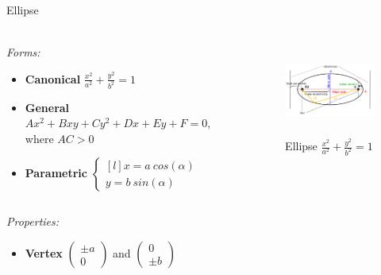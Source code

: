 \documentclass[aspectratio=169]{beamer}
\begin{document}
\begin{frame}[t]{Ellipse}
    \framesubtitle{}
        \scriptsize
        \vspace{-0.4cm}
    \begin{columns}[T,onlytextwidth]
        \begin{column}{0.59\textwidth}
            \textit{Forms:} \\
            \begin{itemize}
                \item \textbf{Canonical} $\frac{x^2}{a^2}+\frac{y^2}{b^2}=1$
                \item \textbf{General} $Ax^2+Bxy+Cy^2+Dx+Ey+F=0$, where $AC > 0$
                \item \textbf{Parametric} $\left\{\begin{matrix*}[l] x = a\  cos(\alpha)\\ y = b\ sin(\alpha) \end{matrix*}\right.$
            \end{itemize}
        \end{column}
        \begin{column}{0.39\textwidth}
            \vspace{-0.5cm}
            \begin{figure}[H]
                \centering\includegraphics[height=3cm,width=1\textwidth,keepaspectratio]{Ellipse.png}
                \vspace{-0.5cm}
                \caption*{\scriptsize Ellipse $\frac{x^2}{a^2}+\frac{y^2}{b^2}=1$}
                \label{fig:Ellipse.png}
            \end{figure}
        \end{column}
    \end{columns}
    \vspace{-0.5cm}
    \textit{Properties:}
    \begin{multicols}{3}
        \begin{itemize}
            \item \textbf{Vertex} $\begin{pmatrix} \pm a\\0 \end{pmatrix}$ and $\begin{pmatrix} 0\\\pm b \end{pmatrix}$

\end{itemize}
\end{multicols}
\end{frame}
\end{document}
